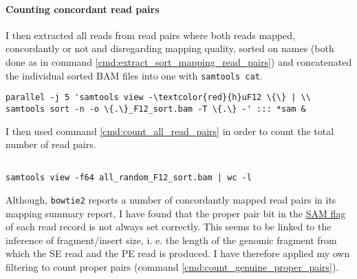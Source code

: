 \documentclass[a4paper,12pt,times,authoryear,twoside,print,index]{Classes/PhDThesisPSnPDF}\usepackage[]{graphicx}\usepackage[]{color}
\begin{document}
\paragraph{Counting \gls{concordant} read pairs}
I then extracted all reads from read pairs where both reads mapped, \gls{concordant}ly or not and disregarding mapping quality, sorted on names (both done as in command \ref{cmd:extract_sort_mapping_read_pairs}) and concatenated the individual sorted BAM files into one with \texttt{samtools cat}.
%
\begin{cmd}
\captionsetup{type=cmd}
\begin{Verbatim}[fontsize=\scriptsize, commandchars=\\\{\}]
parallel -j 5 'samtools view -\textcolor{red}{h}uF12 \{\} | \\
samtools sort -n -o \{.\}_F12_sort.bam -T \{.\} -' ::: *sam &
\end{Verbatim}
\caption{\small This command line extracts from each individual read mapping output file (in \gls{SAM} format) those read pairs where both reads mapped (\texttt{-F12}) and then sorts these SAM records by read name, which is necessary for concatenating the individual files into one with \texttt{samtools cat}.}
\label{cmd:extract_sort_mapping_read_pairs}
\end{cmd}
%
I then used command \ref{cmd:count_all_read_pairs} in order to count the total number of read pairs.
%
\begin{cmd}
\captionsetup{type=cmd}
\begin{Verbatim}[fontsize=\scriptsize, formatcom=\color{darkgray}]

samtools view -f64 all_random_F12_sort.bam | wc -l
\end{Verbatim}
\caption{\small This command line counts the number of SE reads (first in pair) in a mapping output file (binary \gls{SAM} format).}
\label{cmd:count_all_read_pairs}
\end{cmd}
%
Although, \texttt{bowtie2} reports a number of \gls{concordant}ly mapped read pairs in its mapping summary report, I have found that the \gls{proper pair} bit in the \href{http://samtools.github.io/hts-specs/SAMv1.pdf}{SAM flag} of each read record is not always set correctly. This seems to be linked to the inference of fragment/insert size, i. e. the length of the genomic fragment from which the SE read and the PE read is produced. I have therefore applied my own filtering to count \glspl{proper pair} (command \ref{cmd:count_genuine_proper_pairs}).
%
\end{document}
